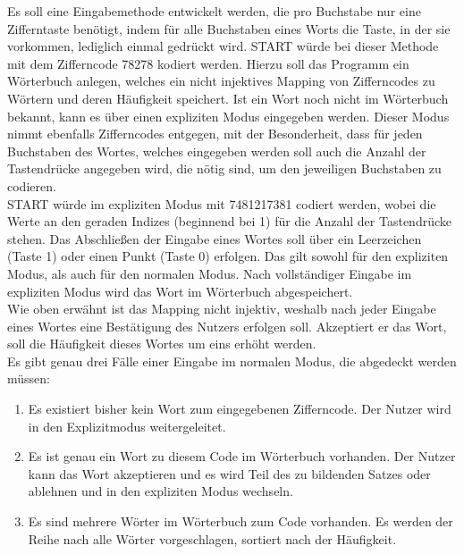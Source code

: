 Es soll eine Eingabemethode entwickelt werden, die pro Buchstabe nur eine Zifferntaste benötigt, indem für alle Buchstaben eines Worts die Taste, in der sie vorkommen, lediglich einmal gedrückt wird.
START würde bei dieser Methode mit dem Zifferncode 78278 kodiert werden.
Hierzu soll das Programm ein Wörterbuch anlegen, welches ein nicht injektives Mapping von Zifferncodes zu Wörtern und deren Häufigkeit speichert.
Ist ein Wort noch nicht im Wörterbuch bekannt, kann es über einen expliziten Modus eingegeben werden.
Dieser Modus nimmt ebenfalls Zifferncodes entgegen, mit der Besonderheit, dass für jeden Buchstaben des Wortes, welches eingegeben werden soll auch die Anzahl der Tastendrücke angegeben wird, die nötig sind, um den jeweiligen Buchstaben zu codieren.\\
START würde im expliziten Modus mit 7481217381 codiert werden, wobei die Werte an den geraden Indizes (beginnend bei 1) für die Anzahl der Tastendrücke stehen.
Das Abschließen der Eingabe eines Wortes soll über ein Leerzeichen (Taste 1) oder einen Punkt (Taste 0) erfolgen.
Das gilt sowohl für den expliziten Modus, als auch für den normalen Modus.
Nach vollständiger Eingabe im expliziten Modus wird das Wort im Wörterbuch abgespeichert.\\
Wie oben erwähnt ist das Mapping nicht injektiv, weshalb nach jeder Eingabe eines Wortes eine Bestätigung des Nutzers erfolgen soll.
Akzeptiert er das Wort, soll die Häufigkeit dieses Wortes um eins erhöht werden.\\
Es gibt genau drei Fälle einer Eingabe im normalen Modus, die abgedeckt werden müssen:

\begin{enumerate}[label={\textbf{Fall~\arabic*:}}, ref={Fall~\arabic*}, leftmargin=*, noitemsep]\label{enm:faelle}
    \item \label{itm:fall-nicht-existent}{Es existiert bisher kein Wort zum eingegebenen Zifferncode.
    Der Nutzer wird in den Explizitmodus weitergeleitet.}
    \item \label{itm:fall-eins-existent}{Es ist genau ein Wort zu diesem Code im Wörterbuch vorhanden.
    Der Nutzer kann das Wort akzeptieren und es wird Teil des zu bildenden Satzes oder ablehnen und in den expliziten Modus wechseln.}
    \item \label{itm:fall-mehrere-existent}{Es sind mehrere Wörter im Wörterbuch zum Code vorhanden.
    Es werden der Reihe nach alle Wörter vorgeschlagen, sortiert nach der Häufigkeit.}
\end{enumerate}

